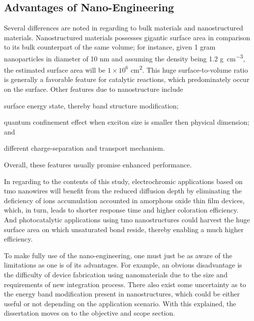 \subsection{Advantages of Nano-Engineering}\label{sec:nanoadv}

Several differences are noted in regarding to bulk materials and nanostructured materials. Nanostructured materials possesses gigantic surface area in comparison to its bulk counterpart of the same volume; for instance, given 1 gram  nanoparticles in diameter of 10 nm and assuming the density being 1.2 \si{g\per cm^3}, the estimated surface area will be $1\times10^6$ \si{cm^2}. This huge surface-to-volume ratio is generally a favorable feature for catalytic reactions, which predominately occur on the surface.\cite{Sha2009} Other features due to nanostructure include 
\begin{enumerate*}[label=\itshape\alph*\upshape)]
\item surface energy state, thereby band structure modification;
\item quantum confinement effect when exciton size is smaller then physical dimension; and
\item different charge-separation and transport mechanism.
\end{enumerate*} Overall, these features usually promise enhanced performance. 

In regarding to the contents of this study, electrochromic applications based on \gls{tmo} nanowires will benefit from the reduced diffusion depth by eliminating the deficiency of ions accumulation accounted in amorphous oxide thin film devices, which, in turn, leads to shorter response time and higher coloration efficiency.\cite{Huang2008a,Scherer2012} And photocatalytic applications using \gls{tmo} nanostructures could harvest the huge surface area on which unsaturated bond reside, thereby enabling a much higher efficiency.\cite{Mills1993,Merki2011,Chen2011b}

To make fully use of the nano-engineering, one must just be as aware of the limitations as one is of its advantages. For example, an obvious disadvantage is the difficulty of device fabrication using nanomaterials due to the size and requirements of new integration process. There also exist some uncertainty as to the energy band modification present in nanostructures, which could be either useful or not depending on the application scenario.\cite{Wang2012} With this explained, the dissertation moves on to the objective and scope section. 

